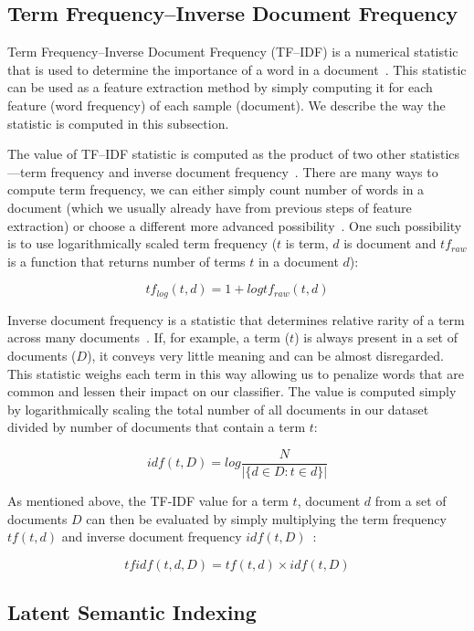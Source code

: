 \subsection{Term Frequency--Inverse Document Frequency}

Term Frequency--Inverse Document Frequency (TF--IDF) is a numerical statistic that is used to determine the importance of a word in a document~\cite{tfidf2014}. This statistic can be used as a feature extraction method by simply computing it for each feature (word frequency) of each sample (document). We describe the way the statistic is computed in this subsection.

The value of TF--IDF statistic is computed as the product of two other statistics---term frequency and inverse document frequency~\cite{tfidf2014}. There are many ways to compute term frequency, we can either simply count number of words in a document (which we usually already have from previous steps of feature extraction) or choose a different more advanced possibility~\cite{manning2008introduction}. One such possibility is to use logarithmically scaled term frequency ($t$ is term, $d$ is document and $tf_{raw}$ is a function that returns number of terms $t$ in a document $d$):

$$tf_{log}(t,d) = 1 + log tf_{raw}(t,d)$$

Inverse document frequency is a statistic that determines relative rarity of a term across many documents~\cite{tfidf2014}. If, for example, a term ($t$) is always present in a set of documents ($D$), it conveys very little meaning and can be almost disregarded. This statistic weighs each term in this way allowing us to penalize words that are common and lessen their impact on our classifier. The value is computed simply by logarithmically scaling the total number of all documents in our dataset divided by number of documents that contain a term $t$:

$$idf(t, D) = log \frac{N}{|\{d \in D : t \in d\}|}$$

As mentioned above, the TF-IDF value for a term $t$, document $d$ from a set of documents $D$ can then be evaluated by simply multiplying the term frequency $tf(t,d)$ and inverse document frequency $idf(t,D)$~\cite{manning2008introduction}:

$$tfidf(t,d,D) = tf(t,d) \times idf(t,D)$$

\subsection{Latent Semantic Indexing}

